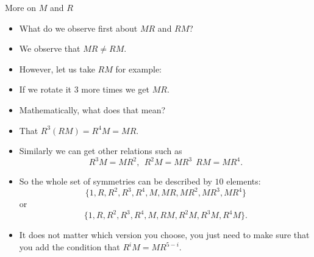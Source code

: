 \documentclass[ %
 10pt, xcolor={dvipsnames,svgnames,x11names,hyperref},
   hyperref={colorlinks=true,citecolor=green,linkcolor=DarkRed,urlcolor=ProcessBlue,anchorcolor=blue}
  ]{beamer}
\newenvironment{stepitemize}{\begin{itemize}[<+->]}{\end{itemize} }
\begin{document}
\begin{frame}{More on $M$ and $R$}
\begin{stepitemize}
    \item What do we observe first about $MR$ and $RM$?
    \item We observe that $MR\neq RM$.
    \item However, let us take $RM$ for example:
    \item If we rotate it $3$ more times we get $MR$.
    \item Mathematically, what does that mean?
    \item That $R^3(RM) = R^4M=MR$.
    \item Similarly we can get other relations such as
    $$R^3M=MR^2, \:\: R^2M=MR^3\:\: RM = MR^4.$$
    \item So the whole set of symmetries can be described by $10$ elements:
    $$\{1, R, R^2, R^3, R^4, M, MR, MR^2, MR^3, MR^4\}$$ or
    $$\{1, R, R^2, R^3, R^4, M, RM, R^2M, R^3M, R^4M\}.$$
    \item It does not matter which version you choose, you just need to make sure that you add the condition that $R^iM = MR^{5-i}$.
\end{stepitemize}

\end{frame}
\end{document}
